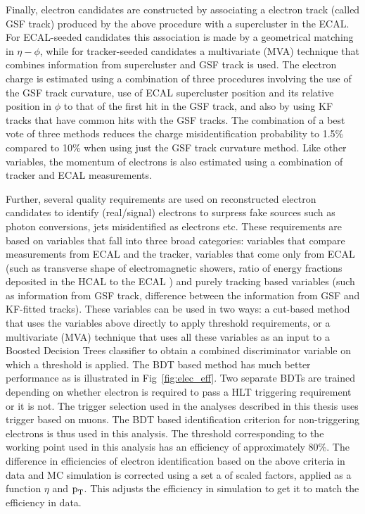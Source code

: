 Finally, electron candidates are constructed by associating a electron track (called GSF track) produced by the above procedure with a supercluster in the ECAL. For ECAL-seeded candidates this association is made by a geometrical matching in $\eta-\phi$, while for tracker-seeded candidates a multivariate (MVA) technique that combines information from supercluster and GSF track is used. The electron charge is estimated using a combination of three procedures involving the use of the GSF track curvature, use of ECAL supercluster position and its relative position in $\phi$ to that of the first hit in the GSF track, and also by using KF tracks that have common hits with the GSF tracks. The combination of a best vote of three methods reduces the charge misidentification probability to 1.5\%  compared to 10\% when using just the GSF track curvature method. Like other variables, the momentum of electrons is also estimated using a combination of tracker and ECAL measurements.


Further, several quality requirements are used on reconstructed electron candidates to identify (real/signal) electrons to surpress fake sources such as photon conversions, jets misidentified as electrons etc.
These requirements are based on variables that fall into three broad categories: variables that compare measurements from ECAL and the tracker, variables that come only from ECAL (such as transverse shape of electromagnetic showers, ratio of energy fractions deposited in the HCAL to the ECAL ) and purely tracking based variables (such as information from GSF track, difference between the information from GSF and KF-fitted tracks). These variables can be used in two ways: a cut-based method that uses the variables above directly to apply threshold requirements, or a multivariate (MVA) technique that uses all these variables as an input to a Boosted Decision Trees classifier to obtain a combined discriminator variable on which a threshold is applied. The BDT based method has much better performance as is illustrated in Fig~\ref{fig:elec_eff}. Two separate BDTs are trained depending on whether electron is required to pass a HLT triggering requirement or it is not. The trigger selection used in the analyses described in this thesis uses trigger based on muons. The BDT based identification criterion for non-triggering electrons is thus used in this analysis. The threshold corresponding to the working point used in this analysis has an efficiency of approximately 80\%. The difference in efficiencies  of electron identification based on the above criteria in data and MC simulation is corrected using a set a of scaled factors, applied as a function $\eta$ and $\text{p}_\text{T}$. This adjusts the efficiency in simulation to get it to match the efficiency in data.  
   

